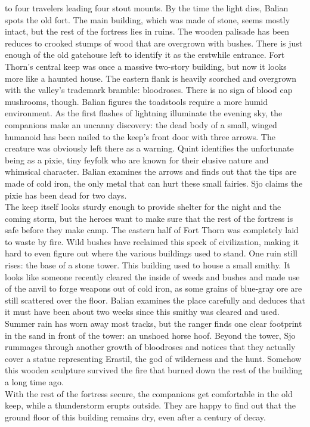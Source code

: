 to four travelers leading four stout mounts. By the time the light dies, Balian spots the old fort. The main building, which was made of stone, seems mostly intact, but the rest of the fortress lies in ruins. The wooden palisade has been reduces to crooked stumps of wood that are overgrown with bushes. There is just enough of the old gatehouse left to identify it as the erstwhile entrance. Fort Thorn's central keep was once a massive two-story building, but now it looks more like a haunted house. The eastern flank is heavily scorched and overgrown with the valley's trademark bramble: bloodroses. There is no sign of blood cap mushrooms, though. Balian figures the toadstools require a more humid environment. As the first flashes of lightning illuminate the evening sky, the companions make an uncanny discovery: the dead body of a small, winged humanoid has been nailed to the keep's front door with three arrows. The creature was obviously left there as a warning. Quint identifies the unfortunate being as a pixie, tiny feyfolk who are known for their elusive nature and whimsical character. Balian examines the arrows and finds out that the tips are made of cold iron, the only metal that can hurt these small fairies. Sjo claims the pixie has been dead for two days.\\

The keep itself looks sturdy enough to provide shelter for the night and the coming storm, but the heroes want to make sure that the rest of the fortress is safe before they make camp. The eastern half of Fort Thorn was completely laid to waste by fire. Wild bushes have reclaimed this speck of civilization, making it hard to even figure out where the various buildings used to stand. One ruin still rises: the base of a stone tower. This building used to house a small smithy. It looks like someone recently cleared the inside of weeds and bushes and made use of the anvil to forge weapons out of cold iron, as some grains of blue-gray ore are still scattered over the floor. Balian examines the place carefully and deduces that it must have been about two weeks since this smithy was cleared and used. Summer rain has worn away most tracks, but the ranger finds one clear footprint in the sand in front of the tower: an unshoed horse hoof. Beyond the tower, Sjo rummages through another growth of bloodroses and notices that they actually cover a statue representing Erastil, the god of wilderness and the hunt. Somehow this wooden sculpture survived the fire that burned down the rest of the building a long time ago.\\

With the rest of the fortress secure, the companions get comfortable in the old keep, while a thunderstorm erupts outside. They are happy to find out that the ground floor of this building remains dry, even after a century of decay.\\

